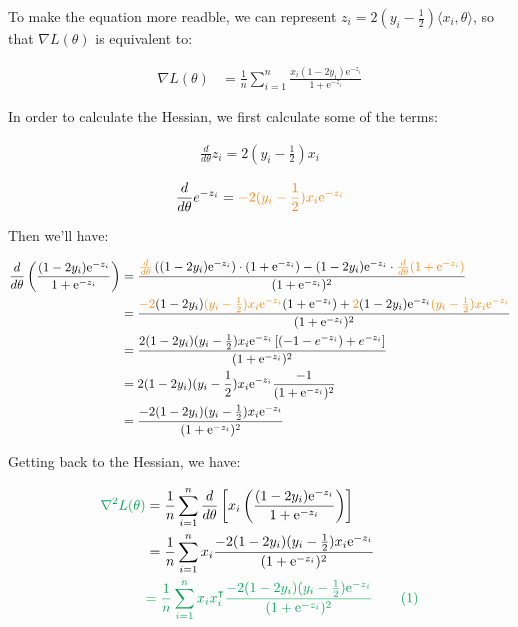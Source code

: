 \documentclass{article}
\begin{document}
To make the equation more readble, 
we can represent $z_i = 2(y_i - \frac{1}{2})\langle x_i, \theta \rangle$, 
so that $\nabla L(\theta)$ is equivalent to:

\begin{align*}
    \nabla L(\theta) 
    &= \frac{1}{n} \sum_{i = 1}^n \frac{x_i(1 - 2y_i)\mathrm{e}^{-z_i}}{1 + \mathrm{e}^{-z_i}}
\end{align*}

In order to calculate the Hessian, 
we first calculate some of the terms:

\begin{align*}
    \frac{d}{d\theta} z_i = 2(y_i - \frac{1}{2})x_i
\end{align*}

\begin{align*}
    \frac{d}{d\theta}e^{-z_i} = \textcolor{orange}{-2(y_i - \frac{1}{2})x_i\mathrm{e}^{-z_i}}
\end{align*}

Then we'll have:

\begin{align*}
    \frac{d}{d\theta} \left( \frac{(1 - 2y_i)\mathrm{e}^{-z_i}}{1 + \mathrm{e}^{-z_i}} \right)
    &= \frac{\textcolor{orange}{\frac{d}{d\theta}}\left((1 - 2y_i)\mathrm{e}^{-z_i} \right) \cdot (1 + \mathrm{e}^{-z_i}) - (1 - 2y_i)\mathrm{e}^{-z_i} \cdot \textcolor{orange}{\frac{d}{d\theta}( 1 + \mathrm{e}^{-z_i})}}{(1 + \mathrm{e}^{-z_i})^2} \\
    &= \frac{\textcolor{orange}{-2}(1 - 2y_i)\textcolor{orange}{(y_i - \frac{1}{2})x_i\mathrm{e}^{-z_i}} (1 + \mathrm{e}^{-z_i}) + \textcolor{orange}{2} (1 - 2y_i)\mathrm{e}^{-z_i} \textcolor{orange}{(y_i - \frac{1}{2})x_i\mathrm{e}^{-z_i}}}{(1 + \mathrm{e}^{-z_i})^2} \\
    &= \frac{2(1 - 2y_i)(y_i - \frac{1}{2})x_i\mathrm{e}^{-z_i}\left[(-1 - e^{-z_i}) + e^{-z_i}\right]}{(1 +\mathrm{e}^{-z_i})^2}\\
    &= 2(1 - 2y_i)(y_i - \frac{1}{2})x_i\mathrm{e}^{-z_i}\frac{-1}{(1 +\mathrm{e}^{-z_i})^2} \\
    &= \frac{-2(1 - 2y_i)(y_i - \frac{1}{2})x_i\mathrm{e}^{-z_i}}{(1 +\mathrm{e}^{-z_i})^2} 
\end{align*}

Getting back to the Hessian, we have:

\begin{align*}
    \textcolor{Green}{\nabla^2 L(\theta)}
    &= \frac{1}{n} \sum_{i = 1}^n \frac{d}{d\theta} \left[ x_i \left( \frac{(1 - 2y_i)\mathrm{e}^{-z_i}}{1 + \mathrm{e}^{-z_i}} \right) \right] \\
    &= \frac{1}{n} \sum_{i = 1}^n x_i \frac{-2(1 - 2y_i)(y_i - \frac{1}{2})x_i\mathrm{e}^{-z_i}}{(1 +\mathrm{e}^{-z_i})^2} \\
    &\textcolor{Green}{= \frac{1}{n} \sum_{i = 1}^n x_i x_i^\intercal  \frac{-2(1 - 2y_i)(y_i - \frac{1}{2})\mathrm{e}^{-z_i}}{(1 +\mathrm{e}^{-z_i})^2} \tag{1}}
\end{align*}
\end{document}
